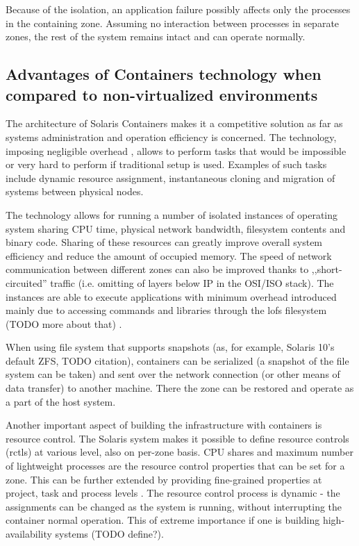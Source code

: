 \documentclass[11pt]{book}
\begin{document}
        Because of the isolation, an application failure possibly affects only the processes in the containing zone.
        Assuming no interaction between processes in separate zones, the rest of the system remains intact and can
        operate normally.
        
      

      \subsection{Advantages of Containers technology when compared to non-virtualized environments}
      \label{sub:}

        The architecture of Solaris Containers makes it a competitive solution as far as systems administration and
        operation efficiency is concerned. The technology, imposing negligible overhead \cite{price}, allows to perform tasks that would be
        impossible or very hard to perform if traditional setup is used. Examples of such tasks include dynamic resource
        assignment, instantaneous cloning and migration of systems between physical nodes.

        The technology allows for running a number of isolated instances of operating system sharing CPU time,
        physical network bandwidth, filesystem contents and binary code. Sharing of these resources can greatly improve
        overall system efficiency and reduce the amount of occupied memory. The speed of network communication between
        different zones can also be improved thanks to ,,short-circuited'' traffic (i.e. omitting of layers below IP in
        the OSI/ISO stack). The instances are able to execute applications with minimum overhead introduced mainly due
        to accessing commands and libraries through the lofs filesystem (TODO more about that) \cite{price}.

        When using file system that supports snapshots (as, for example, Solaris 10's default ZFS, TODO citation), containers can be
        serialized (a snapshot of the file system can be taken) and sent over the network connection (or other means of
        data transfer) to another machine. There the zone can be restored and operate as a part of the host system.

        Another important aspect of building the infrastructure with containers is resource control. The Solaris system
        makes it possible to define resource controls (rctls) at various level, also on per-zone basis. CPU shares and
        maximum number of lightweight processes are the resource control properties that can be set for a zone. This can
        be further extended by providing fine-grained properties at project, task and process levels \cite{sag}. The
        resource control process is dynamic - the assignments can be changed as the system is running, without
        interrupting the container normal operation. This of extreme importance if one is building high-availability systems (TODO define?).
\end{document}
